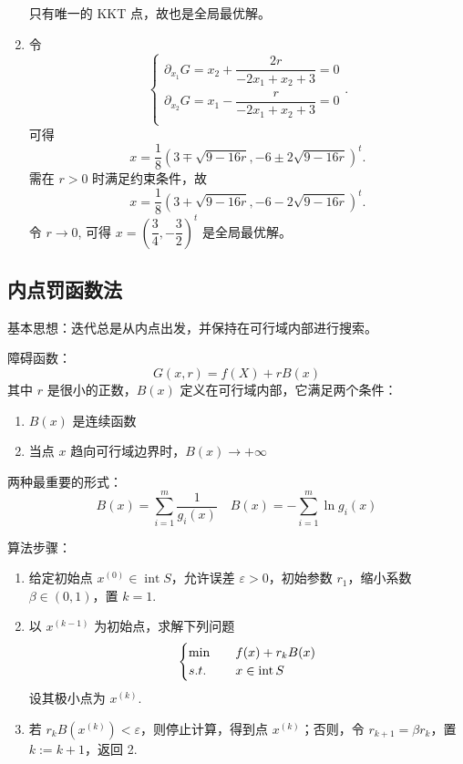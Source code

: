 \begin{example}
\begin{enumerate}
        只有唯一的 KKT 点，故也是全局最优解。
        \item 令 
        \[
            \begin{cases}
                \partial_{x_1}G = x_2 + \dfrac{2r}{-2x_1 + x_2 + 3} = 0\\
                \partial_{x_2}G = x_1 - \dfrac{r}{-2x_1 + x_2 + 3} = 0\\
            \end{cases}.
        \] 
        可得 
        \[
            x = \frac{1}{8}(3 \mp \sqrt{9 - 16r}, -6 \pm 2\sqrt{9 - 16r})^t.
        \] 
        需在 $r > 0$ 时满足约束条件，故 
        \[
            x = \frac{1}{8}(3 + \sqrt{9 - 16r}, -6 - 2\sqrt{9 - 16r})^t.
        \] 
        令 $r \to 0$, 可得 $x = \left(\dfrac{3}{4}, -\dfrac{3}{2}\right)^t$ 是全局最优解。
    \end{enumerate}
\end{example}

\subsection{内点罚函数法}
基本思想：迭代总是从内点出发，并保持在可行域内部进行搜索。

\begin{note}
    障碍函数：\[G(x, r) = f(X) + rB(x)\]
    其中 $r$ 是很小的正数，$B(x)$ 定义在可行域内部，它满足两个条件：\begin{enumerate}
        \item $B(x)$ 是连续函数
        \item 当点 $x$ 趋向可行域边界时，$B(x) \to +\infty$
    \end{enumerate}
    两种最重要的形式：\[B(x) = \sum_{i = 1}^m \frac{1}{g_i(x)} \quad B(x) = -\sum_{i = 1}^m\ln g_i(x)\]
\end{note}

\begin{note}
    算法步骤：\begin{enumerate}
        \item 给定初始点 $x^{(0)} \in \operatorname{int} S$，允许误差 $\varepsilon > 0$，初始参数 $r_1$，缩小系数 $\beta\in (0, 1)$，置 $k=1$.
        \item 以 $x^{(k - 1)}$ 为初始点，求解下列问题\[\begin{cases}
            \min \quad &f(x) + r_kB(x)\\
            s.t. \quad &x \in \operatorname{int} S
        \end{cases}\] 设其极小点为 $x^{(k)}$.
        \item 若 $r_kB(x^{(k)}) < \varepsilon$，则停止计算，得到点 $x^{(k)}$；否则，令 $r_{k + 1} = \beta r_k$，置 $k := k + 1$，返回 2.
    \end{enumerate}
\end{note}

